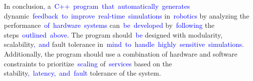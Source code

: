 \documentclass{article}
\begin{document}
\begin{tcolorbox}[colframe=black,colback=white]
{}In conclusion\textcolor{blue}{,} a\textcolor{blue}{~C}\textcolor{blue}{++}\textcolor{blue}{~program}\textcolor{blue}{~that}\textcolor{blue}{~automatically}\textcolor{blue}{~generates} dynamic\textcolor{blue}{~feedback}\textcolor{blue}{~to}\textcolor{blue}{~improve}\textcolor{blue}{~real}\textcolor{blue}{-time}\textcolor{blue}{~simulations} in\textcolor{blue}{~robotics} by analyzing the performance\textcolor{blue}{~of}\textcolor{blue}{~hardware}\textcolor{blue}{~systems} can\textcolor{blue}{~be}\textcolor{blue}{~developed} by\textcolor{blue}{~following} the steps\textcolor{blue}{~outlined}\textcolor{blue}{~above}\textcolor{blue}{.} The program should\textcolor{blue}{~be} designed with modularity\textcolor{blue}{,} scalability\textcolor{blue}{,}\textcolor{blue}{~and} fault tolerance in\textcolor{blue}{~mind}\textcolor{blue}{~to}\textcolor{blue}{~handle}\textcolor{blue}{~highly}\textcolor{blue}{~sensitive}\textcolor{blue}{~simulations}\textcolor{blue}{.} Additionally, the program should use a combination of hardware and software constraints to prioritize\textcolor{blue}{~scaling} of\textcolor{blue}{~services} based on the stability\textcolor{blue}{,}\textcolor{blue}{~latency}\textcolor{blue}{,}\textcolor{blue}{~and}\textcolor{blue}{~fault} tolerance of the system.\textcolor{blue}{}
\end{tcolorbox}
\end{document}
